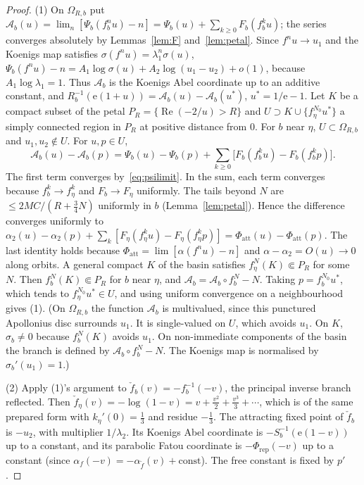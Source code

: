 \documentclass[11pt]{amsart}
\theoremstyle{definition}
\newcommand{\Rr}{R}
\newcommand{\eee}{\mathrm{e}}
\begin{document}
\begin{proof}
(1) On $\Omega_{R,b}$ put
$\mathcal A_b(u)=\lim_n[\Psi_b(f_b^nu)-n]=\Psi_b(u)+\sum_{k\ge0}F_b(f_b^ku)$;
the series converges absolutely by Lemmas~\ref{lem:F} and~\ref{lem:petal}.
Since $f^nu\to u_1$ and the Koenigs map satisfies
$\sigma(f^nu)=\lambda_1^n\sigma(u)$,
$\Psi_b(f^nu)-n=A_1\log\sigma(u)+A_2\log(u_1-u_2)+o(1)$, because
$A_1\log\lambda_1=1$.  Thus $\mathcal A_b$ is the Koenigs Abel coordinate up to
an additive constant, and
$\Rr_b^{-1}(\eee(1+u))=\mathcal A_b(u)-\mathcal A_b(u^*)$, $u^*=1/\eee-1$.
Let $K$ be a compact subset of the petal
$P_R=\{\operatorname{Re}(-2/u)>R\}$ and $U\supset K\cup\{f_\eta^{N_0}u^*\}$ a
simply connected region in $P_R$ at positive distance from $0$.  For $b$ near
$\eta$, $U\subset\Omega_{R,b}$ and $u_1,u_2\notin U$.  For $u,p\in U$,
\[
 \mathcal A_b(u)-\mathcal A_b(p)=\Psi_b(u)-\Psi_b(p)
 +\sum_{k\ge0}\bigl[F_b(f_b^ku)-F_b(f_b^kp)\bigr].
\]
The first term converges by~\eqref{eq:psilimit}.  In the sum, each term
converges because $f_b^k\to f_\eta^k$ and $F_b\to F_\eta$ uniformly.  The tails
beyond $N$ are $\le 2MC/(R+\tfrac34N)$ uniformly in $b$ (Lemma~\ref{lem:petal}).
Hence the difference converges uniformly to
$\alpha_2(u)-\alpha_2(p)+\sum_k[F_\eta(f_\eta^ku)-F_\eta(f_\eta^kp)]
 =\Phi_{\mathrm{att}}(u)-\Phi_{\mathrm{att}}(p)$.  The last identity holds
because $\Phi_{\mathrm{att}}=\lim[\alpha(f^nu)-n]$ and
$\alpha-\alpha_2=O(u)\to0$ along orbits.  A general compact $K$ of the basin
satisfies $f_\eta^{N}(K)\Subset P_R$ for some $N$.  Then
$f_b^N(K)\Subset P_R$ for $b$ near $\eta$, and
$\mathcal A_b=\mathcal A_b\circ f_b^N-N$.  Taking $p=f_b^{N_0}u^*$, which
tends to $f_\eta^{N_0}u^*\in U$, and using uniform convergence on a
neighbourhood gives (1).  (On $\Omega_{R,b}$ the function $\mathcal A_b$ is
multivalued, since this punctured Apollonius disc surrounds $u_1$.
It is single-valued on $U$, which
avoids $u_1$.  On $K$, $\sigma_b\ne0$ because $f_b^N(K)$ avoids $u_1$.  On
non-immediate components of the basin the branch is defined by
$\mathcal A_b\circ f_b^N-N$.  The Koenigs map is normalised by
$\sigma_b'(u_1)=1$.)

(2) Apply (1)'s argument to $\check f_b(v)=-f_b^{-1}(-v)$, the principal inverse
branch reflected.  Then $\check f_\eta(v)=-\log(1-v)=v+\tfrac{v^2}2+\tfrac{v^3}3+\cdots$,
which is of the same prepared form with $k_\eta'(0)=\tfrac13$ and residue
$-\tfrac13$.  The attracting fixed point of $\check f_b$ is $-u_2$, with multiplier
$1/\lambda_2$.  Its Koenigs Abel coordinate is $-S_b^{-1}(\eee(1-v))$ up to a
constant, and its parabolic Fatou coordinate is $-\Phi_{\mathrm{rep}}(-v)$ up
to a constant (since $\alpha_{f}(-v)=-\alpha_{\check f}(v)+\text{const}$).  The free
constant is fixed by $p'$.
\end{proof}
\end{document}
